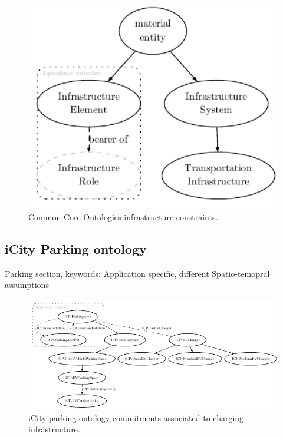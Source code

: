 \begin{figure}[h]
    \caption{Common Core Ontologies infrastructure constraints.}
    \centering
    \includegraphics[width=1.0\textwidth]{images/infrastructureSystem}
\end{figure}



\subsection{iCity Parking ontology}

Parking section, keywords: Application specific, different Spatio-temopral assumptions

\begin{figure}[h]
    \caption{iCity parking ontology commitments associated to charging infrastructure.}
    \centering
    \includegraphics[width=1.0\textwidth]{images/PARKING}
\end{figure}

